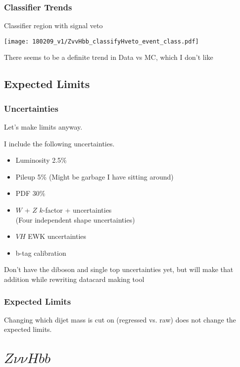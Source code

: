 \documentclass{beamer}
\begin{document}
\begin{frame}
  \frametitle{Classifier Trends}
  Classifier region with signal veto

  \begin{center}
    \texttt{[image: 180209\_v1/ZvvHbb\_classifyHveto\_event\_class.pdf]}
  \end{center}

  There seems to be a definite trend in Data vs MC, which I don't like
\end{frame}

\subsection{Expected Limits}

\begin{frame}
  \frametitle{Uncertainties}
  Let's make limits anyway.

  \vspace{24pt}

  I include the following uncertainties.

  \begin{itemize}
  \item Luminosity 2.5\%
  \item Pileup 5\% (Might be garbage I have sitting around)
  \item PDF 30\%
  \item $W$ + $Z$ $k$-factor  +  uncertainties \\
    (Four independent shape uncertainties)
  \item $VH$ EWK uncertainties
  \item b-tag calibration
  \end{itemize}

  Don't have the diboson and single top uncertainties yet,
  but will make that addition while rewriting datacard making tool

\end{frame}

\begin{frame}
  \frametitle{Expected Limits}
  

  Changing which dijet mass is cut on (regressed vs. raw)
  does not change the expected limits.
\end{frame}

\section{$Z \nu\nu Hbb$}
\end{document}
